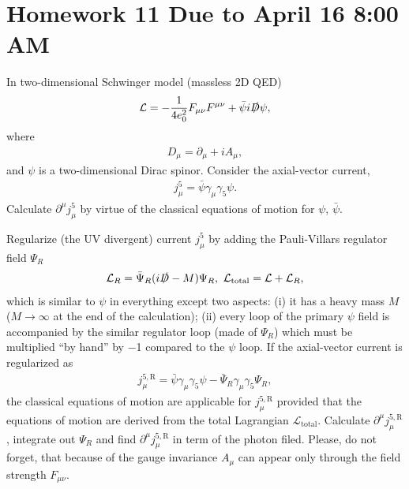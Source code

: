\section*{Homework 11 Due to April 16 8:00 AM}
In two-dimensional Schwinger model (massless 2D QED)
\begin{align}
    \mathcal{L}=-\frac{1}{4 e_0^2}F_{\mu\nu}F^{\mu\nu}+\bar{\psi}i\slashed{D}\psi,
\end{align}
where 
\begin{align}
    D_\mu = \partial_\mu + i A_\mu,
\end{align}
and $\psi$ is a two-dimensional Dirac spinor. Consider the axial-vector current, 
\begin{align}
    j_\mu^5 = \bar{\psi}\gamma_\mu\gamma_5\psi.
\end{align}
Calculate $\partial^\mu j_\mu^5$ by virtue of the classical equations of motion for $\psi$, $\bar{\psi}$. 


Regularize (the UV divergent) current $j_\mu^5$ by adding the Pauli-Villars regulator field $\Psi_R$ 
\begin{align}
    \mathcal{L}_R = \bar{\Psi}_R(i\slashed{D}-M)\Psi_R, \ \mathcal{L}_{\text{total}} = \mathcal{L} + \mathcal{L}_R,
\end{align}
which is similar to $\psi$ in everything except two aspects: (i) it has a heavy mass $M$ ($M\to\infty$ at the end of the calculation); (ii) every loop of the primary $\psi$ field is accompanied by the similar regulator loop (made of $\Psi_R$) which must be multiplied “by hand” by −1 compared to the $\psi$ loop. If the axial-vector current is regularized as 
\begin{align}
    j_\mu^{5,\text{R}} = \bar{\psi}\gamma_\mu\gamma_5\psi - \bar{\Psi}_R\gamma_\mu\gamma_5\Psi_R,
\end{align} 
the classical equations of motion are applicable for $j_\mu^{5,\text{R}}$ provided that the equations of motion are derived from the total Lagrangian $\mathcal{L}_{\text{total}}$. Calculate $\partial^\mu j_\mu^{5,\text{R}}$, integrate out $\Psi_R$ and find $\partial^\mu j_\mu^{5,\text{R}}$ in term of the photon filed. Please, do not forget, that because of the gauge invariance $A_\mu$ can appear only through the field strength $F_{\mu\nu}$.

